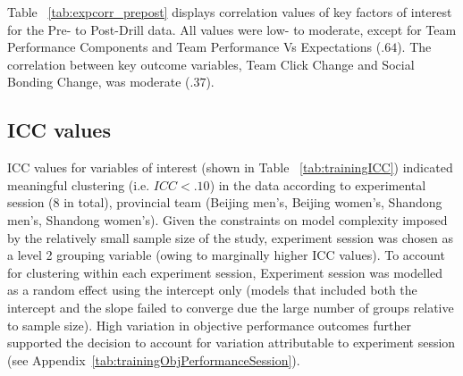 \begin{CJK}{UTF8}{gbsn}
Table ~\ref{tab:expcorr_prepost} displays correlation values of key factors of interest for the Pre- to Post-Drill data.  All values were low- to moderate, except for Team Performance Components and Team Performance Vs Expectations ($.64$).  The correlation between key outcome variables, Team Click Change and Social Bonding Change, was moderate ($.37$).




\subsection{ICC values}

ICC values for variables of interest (shown in Table ~\ref{tab:trainingICC}) indicated meaningful clustering (i.e. $ICC <.10$) in the data according to experimental session (8 in total), provincial team (Beijing men's, Beijing women's, Shandong men's, Shandong women's).  Given the constraints on model complexity imposed by the relatively small sample size of the study, experiment session was chosen as a level 2 grouping variable (owing to marginally higher ICC values).  To account for clustering within each experiment session, Experiment session was modelled as a random effect using the intercept only (models that included both the intercept and the slope failed to converge due the large number of groups relative to sample size).  High variation in objective performance outcomes further supported the decision to account for variation attributable to experiment session (see Appendix~\ref{tab:trainingObjPerformanceSession}).







\end{CJK}
